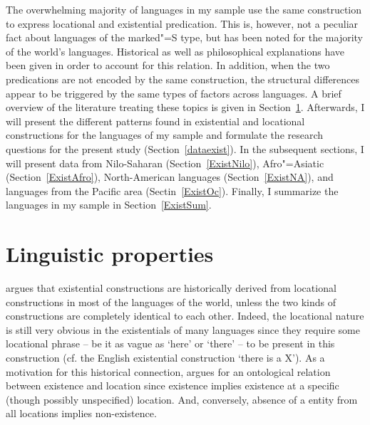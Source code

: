 The overwhelming majority of languages in my sample use the same construction to express locational and existential predication.
This is, however, not a peculiar fact about languages of the marked"=S type, but has been noted for the majority of the world's languages.
Historical as well as philosophical explanations have been given in order to account for this relation. %
In addition, when the two predications are not encoded by the same construction, the structural differences appear to be triggered by the same types of factors across languages. 
A brief overview of the literature treating these topics is given in Section~\ref{lingproploc}.
Afterwards, I will present the different patterns found in existential and locational constructions for the languages of my sample and formulate the research questions for the present study (Section~\ref{dataexist}). 
In the subsequent sections, I will present data from Nilo-Saharan (Section~\ref{ExistNilo}), Afro"=Asiatic (Section~\ref{ExistAfro}), North-American languages (Section~\ref{ExistNA}), and languages from the Pacific area (Sectin~\ref{ExistOc}).
Finally, I summarize the languages in my sample in Section~\ref{ExistSum}.
 
\section{Linguistic properties}\label{lingproploc}


\citet{Lyons:1967,Lyons:1968} argues that existential constructions are historically derived from locational constructions in most of the languages of the world, unless the two kinds of constructions are completely identical to each other.
Indeed, the locational nature is still very obvious in the existentials of many languages since they require some locational phrase -- be it as vague as `here' or `there' -- to be present in this construction (cf. the English existential construction `there is a X').
As a motivation for this historical connection, \citet[499]{Lyons:1968} argues for an ontological relation between existence and location since existence implies existence at a specific (though possibly unspecified) location. And, conversely, absence of a entity from all locations implies non-existence. 

